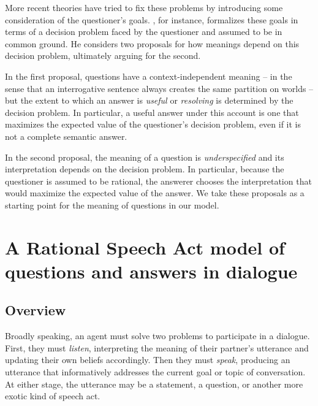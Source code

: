 \documentclass[12pt, floatsintext, jou]{apa6}
\begin{document}
More recent theories have tried to fix these problems by introducing some consideration of the questioner's goals. , for instance, formalizes these goals in terms of a decision problem faced by the questioner and assumed to be in common ground. He considers two proposals for how meanings depend on this decision problem, ultimately arguing for the second. 

In the first proposal, questions have a context-independent meaning -- in the sense that an interrogative sentence always creates the same partition on worlds -- but the extent to which an answer is \emph{useful} or \emph{resolving} is determined by the decision problem. In particular, a useful answer under this account is one that maximizes the expected value of the questioner's decision problem, even if it is not a complete semantic answer. 

In the second proposal, the meaning of a question is \emph{underspecified} and its interpretation depends on the decision problem. In particular, because the questioner is assumed to be rational, the answerer chooses the interpretation that would maximize the expected value of the answer. We take these proposals as a starting point for the meaning of questions in our model.

\section{A Rational Speech Act model of \\questions and answers in dialogue}

\subsection{Overview}

Broadly speaking, an agent must solve two problems to participate in a dialogue. First, they must \emph{listen}, interpreting the meaning of their partner's utterance and updating their own beliefs accordingly. Then they must \emph{speak}, producing an utterance that informatively addresses the current goal or topic of conversation. At either stage, the utterance may be a statement, a question, or another more exotic kind of speech act. 
\end{document}
